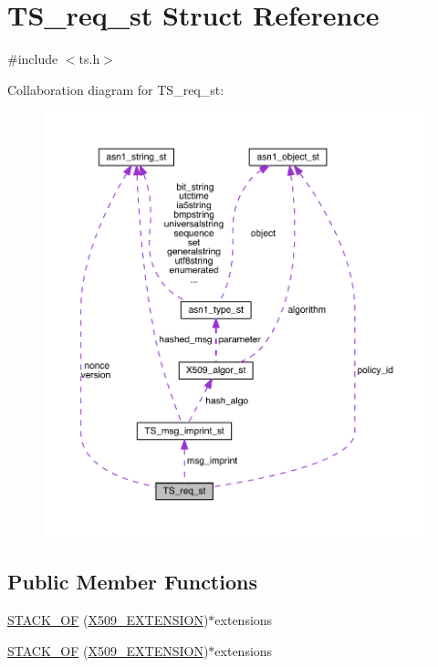 \hypertarget{struct_t_s__req__st}{}\section{T\+S\+\_\+req\+\_\+st Struct Reference}
\label{struct_t_s__req__st}


{\ttfamily \#include $<$ts.\+h$>$}



Collaboration diagram for T\+S\+\_\+req\+\_\+st\+:\nopagebreak
\begin{figure}[H]
\begin{center}
\leavevmode
\includegraphics[width=350pt]{struct_t_s__req__st__coll__graph}
\end{center}
\end{figure}
\subsection*{Public Member Functions}
\begin{DoxyCompactItemize}
\item 
\hyperlink{struct_t_s__req__st_a9674726b03b076fb4ef08b04c1417a0d}{S\+T\+A\+C\+K\+\_\+\+OF} (\hyperlink{crypto_2x509_2x509_8h_ab2f7f7dc0ced8684e0cbfc818e408304}{X509\+\_\+\+E\+X\+T\+E\+N\+S\+I\+ON})$\ast$extensions
\item 
\hyperlink{struct_t_s__req__st_a9674726b03b076fb4ef08b04c1417a0d}{S\+T\+A\+C\+K\+\_\+\+OF} (\hyperlink{crypto_2x509_2x509_8h_ab2f7f7dc0ced8684e0cbfc818e408304}{X509\+\_\+\+E\+X\+T\+E\+N\+S\+I\+ON})$\ast$extensions
\end{DoxyCompactItemize}

